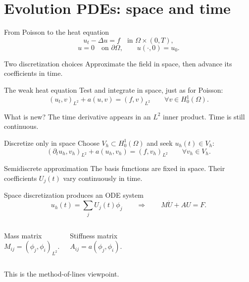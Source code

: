 \documentclass[aspectratio=169,11pt]{beamer}
\begin{document}
\section{Evolution PDEs: space and time}
\begin{frame}{From Poisson to the heat equation}
\[
u_t-\Delta u=f\quad\text{in }\Omega\times(0,T),
\]\[
u=0\quad\text{on }\partial\Omega,\qquad u(\cdot,0)=u_0.
\]\begin{exampleblock}{Two discretization choices}
Approximate the field in space, then advance its coefficients in time.
\end{exampleblock}
\end{frame}

\begin{frame}{The weak heat equation}
Test and integrate in space, just as for Poisson:\[
\boxed{(u_t,v)_{L^2}+a(u,v)=(f,v)_{L^2}\qquad\forall v\in H_0^1(\Omega).}
\]\begin{exampleblock}{What is new?}
The time derivative appears in an $L^2$ inner product. Time is still continuous.
\end{exampleblock}
\end{frame}

\begin{frame}{Discretize only in space}
Choose $V_h\subset H_0^1(\Omega)$ and seek $u_h(t)\in V_h$:\[
(\partial_tu_h,v_h)_{L^2}+a(u_h,v_h)=(f,v_h)_{L^2}\qquad\forall v_h\in V_h.
\]\begin{exampleblock}{Semidiscrete approximation}
The basis functions are fixed in space. Their coefficients $U_j(t)$ vary continuously in time.
\end{exampleblock}
\end{frame}

\begin{frame}{Space discretization produces an ODE system}
\[
u_h(t)=\sum_jU_j(t)\phi_j\qquad\Longrightarrow\qquad\boxed{M\dot U+AU=F.}
\]\begin{columns}[c,onlytextwidth]
\begin{block}{Mass matrix}
\[
M_{ij}=(\phi_j,\phi_i)_{L^2}.
\]
\end{block}
\begin{exampleblock}{Stiffness matrix}
\[
A_{ij}=a(\phi_j,\phi_i).
\]
\end{exampleblock}
\end{columns}This is the method-of-lines viewpoint.
\end{frame}
\end{document}

